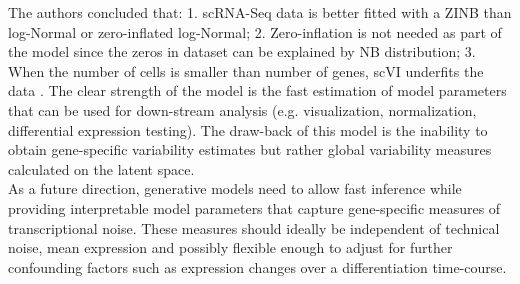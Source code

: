 The authors concluded that: 1. scRNA-Seq data is better fitted with a ZINB than log-Normal or zero-inflated log-Normal; 2. Zero-inflation is not needed as part of the model since the zeros in dataset can be explained by NB distribution; 3. When the number of cells is smaller than number of genes, scVI underfits the data \citep{Lopez2018}. The clear strength of the model is the fast estimation of model parameters that can be used for down-stream analysis (e.g. visualization, normalization, differential expression testing). The draw-back of this model is the inability to obtain gene-specific variability estimates but rather global variability measures calculated on the latent space. \\

As a future direction, generative models need to allow fast inference while providing interpretable model parameters that capture gene-specific measures of transcriptional noise. These measures should ideally be independent of technical noise, mean expression and possibly flexible enough to adjust for further confounding factors such as expression changes over a differentiation time-course. 
 


